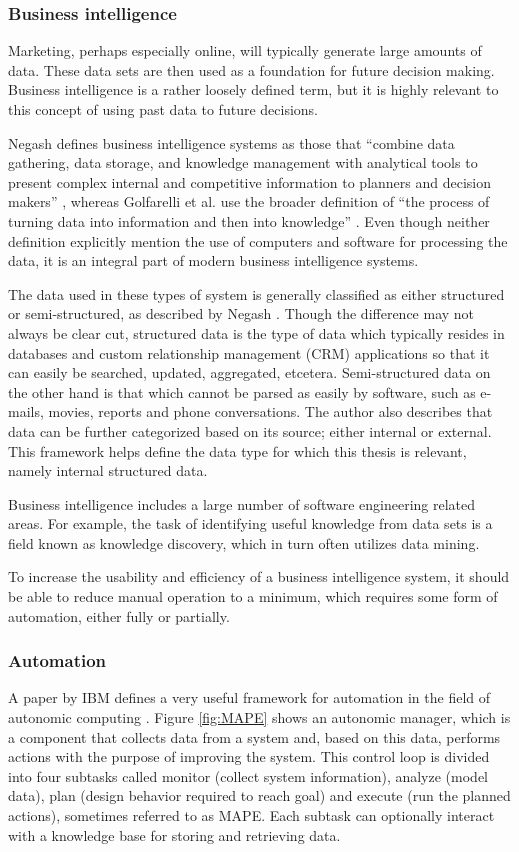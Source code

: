 \documentclass{sig-alternate}
\begin{document}
\subsubsection{Business intelligence}
Marketing, perhaps especially online, will typically generate large amounts of data. These data sets are then used as a foundation for future decision making. Business intelligence is a rather loosely defined term, but it is highly relevant to this concept of using past data to future decisions.

Negash defines business intelligence systems as those that ``combine data gathering, data storage, and knowledge management with analytical tools to present complex internal and competitive information to planners and decision makers'' \cite{Negash2004}, whereas Golfarelli et al. use the broader definition of ``the process of turning data into information and then into knowledge'' \cite{Golfarelli2004}. Even though neither definition explicitly mention the use of computers and software for processing the data, it is an integral part of modern business intelligence systems.

The data used in these types of system is generally classified as either structured or semi-structured, as described by Negash \cite{Negash2004}. Though the difference may not always be clear cut, structured data is the type of data which typically resides in databases and custom relationship management (CRM) applications so that it can easily be searched, updated, aggregated, etcetera. Semi-structured data on the other hand is that which cannot be parsed as easily by software, such as e-mails, movies, reports and phone conversations. The author also describes that data can be further categorized based on its source; either internal or external. This framework helps define the data type for which this thesis is relevant, namely internal structured data.

Business intelligence includes a large number of software engineering related areas. For example, the task of identifying useful knowledge from data sets is a field known as knowledge discovery, which in turn often utilizes data mining.

To increase the usability and efficiency of a business intelligence system, it should be able to reduce manual operation to a minimum, which requires some form of automation, either fully or partially.

\subsubsection{Automation}
A paper by IBM defines a very useful framework for automation in the field of autonomic computing \cite{IBM2006}. Figure \ref{fig:MAPE} shows an autonomic manager, which is a component that collects data from a system and, based on this data, performs actions with the purpose of improving the system. This control loop is divided into four subtasks called monitor (collect system information), analyze (model data), plan (design behavior required to reach goal) and execute (run the planned actions), sometimes referred to as MAPE. Each subtask can optionally interact with a knowledge base for storing and retrieving data.
\end{document}
